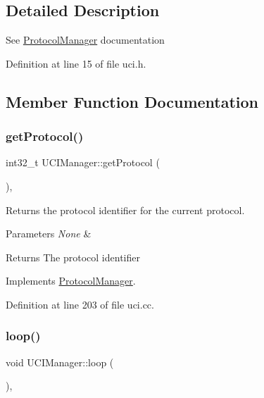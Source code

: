\subsection{Detailed Description}
See \mbox{\hyperlink{classProtocolManager}{Protocol\+Manager}} documentation 

Definition at line 15 of file uci.\+h.



\subsection{Member Function Documentation}
\mbox{\label{classUCIManager_af85c53751a85a5cb624e10fb1f9962c7}} 
\subsubsection{\texorpdfstring{get\+Protocol()}{getProtocol()}}
{\footnotesize\ttfamily int32\+\_\+t U\+C\+I\+Manager\+::get\+Protocol (\begin{DoxyParamCaption}{ }\end{DoxyParamCaption})\hspace{0.3cm}{\ttfamily [override]}, {\ttfamily [virtual]}}



Returns the protocol identifier for the current protocol. 


\begin{DoxyParams}{Parameters}
{\em None} & \\
\hline
\end{DoxyParams}
\begin{DoxyReturn}{Returns}
The protocol identifier 
\end{DoxyReturn}


Implements \mbox{\hyperlink{classProtocolManager_a2ab274fd7510b28e7ac36405aebdbe82}{Protocol\+Manager}}.



Definition at line 203 of file uci.\+cc.

\mbox{\label{classUCIManager_aa2fa2a352e6d58f00c8388da0d8541e1}} 
\subsubsection{\texorpdfstring{loop()}{loop()}}
{\footnotesize\ttfamily void U\+C\+I\+Manager\+::loop (\begin{DoxyParamCaption}{ }\end{DoxyParamCaption})\hspace{0.3cm}{\ttfamily [override]}, {\ttfamily [virtual]}}



